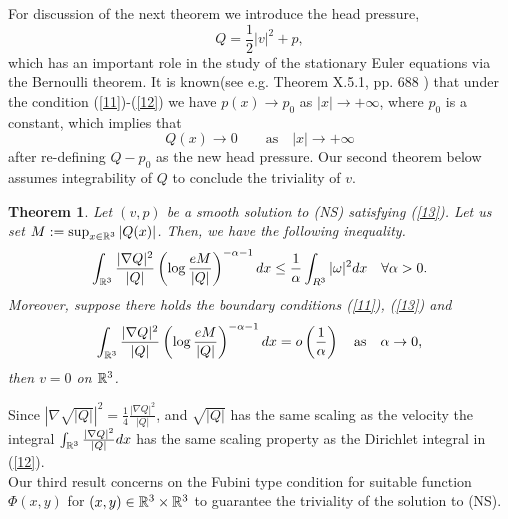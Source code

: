 \documentclass[12pt]{article}
\numberwithin{equation}{section}
\newtheorem{thm}{Theorem}[section]
\theoremstyle{definition}
\begin{document}
For discussion of the next theorem we introduce the head pressure,
$$Q=\frac12 |v|^2 +p,$$
which has an  important role in the study of the stationary Euler equations via the Bernoulli theorem. It is known(see e.g. Theorem X.5.1, pp. 688 \cite{Galdi}) that under the condition (\ref{11})-(\ref{12}) we have $p(x)\to p_0$ as $|x|\to +\infty$, where $p_0$ 
is a constant, which implies that  
\begin{equation}\label{13}
Q(x)\to 0 \qquad \mbox{as}\quad  |x|\to +\infty
\end{equation}
after  re-defining $Q-p_0$ as the new head pressure.  Our second theorem below assumes integrability of $Q$ to conclude the triviality of $v$.
\begin{thm}
Let $(v,p)$ be a smooth solution to (NS) satisfying  (\ref{13}). Let us set $M:=\sup_{x\in \Bbb R^3} |Q(x)|$. 
 Then,  we have the  following inequality.
\begin{equation}\label{th11}
\int_{\Bbb R^3} \frac{|\nabla Q|^2}{|Q|} \left(\log \frac{eM}{|Q|} \right)^{-{\alpha}-1} dx\leq \frac{1}{\alpha} \int_{\Bbb \Bbb R^3} |{\omega}|^2 dx \quad \forall {\alpha} >0.
\end{equation}
Moreover, suppose there holds  the boundary conditions (\ref{11}), (\ref{13}) and 
\begin{equation}\label{th12}
\int_{\Bbb R^3} \frac{|\nabla Q|^2}{|Q|} \left(\log \frac{eM}{|Q|} \right)^{-{\alpha}-1} dx=o\left(\frac{1}{\alpha}\right)\quad \mbox{as}\quad {\alpha} \to 0,
\end{equation}
then $v=0$  on $\Bbb R^3$.
\end{thm}
 Since $|\nabla \sqrt{|Q|}|^2 = \frac14\frac{|\nabla Q|^2}{|Q|}$, and $\sqrt{|Q|}$ has the same scaling as the velocity
the integral $\int_{\Bbb R^3} \frac{|\nabla Q|^2}{|Q|}dx $ has the same scaling property as the Dirichlet integral in (\ref{12}).\\

Our third result concerns on the Fubini type condition for suitable function $\Phi(x,y)$ for $(x,y)\in \Bbb R^3\times \Bbb R^3$ to guarantee the triviality of 
the solution to (NS).
\end{document}

